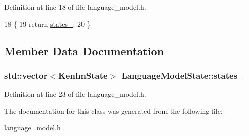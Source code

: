 Definition at line 18 of file language\+\_\+model.\+h.


\begin{DoxyCode}
18                                                    \{
19       \textcolor{keywordflow}{return} \hyperlink{classLanguageModelState_a725ff1669df2fff270866b28d2c02c42}{states\_};
20     \}
\end{DoxyCode}


\subsection{Member Data Documentation}
\subsubsection[{\texorpdfstring{states\+\_\+}{states_}}]{\setlength{\rightskip}{0pt plus 5cm}std\+::vector$<${\bf Kenlm\+State}$>$ Language\+Model\+State\+::states\+\_\+\hspace{0.3cm}{\ttfamily [private]}}\hypertarget{classLanguageModelState_a725ff1669df2fff270866b28d2c02c42}{}\label{classLanguageModelState_a725ff1669df2fff270866b28d2c02c42}


Definition at line 23 of file language\+\_\+model.\+h.



The documentation for this class was generated from the following file\+:\begin{DoxyCompactItemize}
\item 
\hyperlink{language__model_8h}{language\+\_\+model.\+h}\end{DoxyCompactItemize}
